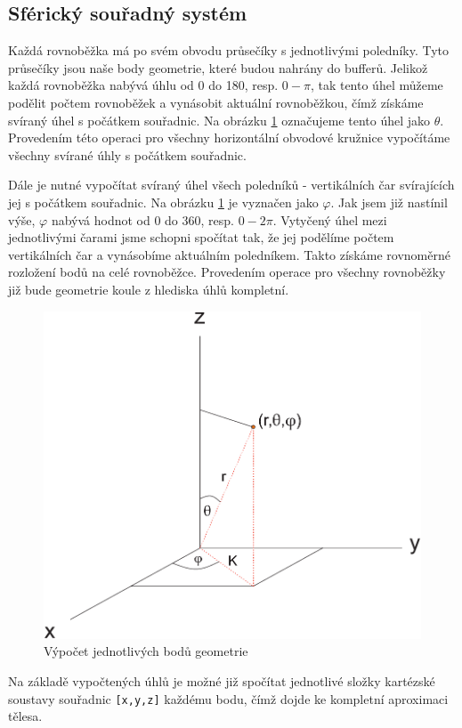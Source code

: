 \subsection{Sférický souřadný systém}

Každá rovnoběžka má po svém obvodu průsečíky s jednotlivými poledníky. Tyto průsečíky jsou naše body geometrie, které budou nahrány do bufferů. Jelikož každá rovnoběžka nabývá úhlu od 0 do 180\degree,  resp. $0-\pi$, tak tento úhel můžeme podělit počtem rovnoběžek a vynásobit aktuální rovnoběžkou, čímž získáme svíraný úhel s počátkem souřadnic. Na obrázku \ref{fig:geom} označujeme tento úhel jako $\theta$. Provedením této operaci pro všechny horizontální obvodové kružnice vypočítáme všechny svírané úhly s počátkem souřadnic. 

Dále je nutné vypočítat svíraný úhel všech poledníků - vertikálních čar svírajících jej s počátkem souřadnic. Na obrázku \ref{fig:geom} je vyznačen jako $\varphi$. Jak jsem již nastínil výše, $\varphi$ nabývá hodnot od 0 do 360\degree, resp. $0-2\pi$. Vytyčený úhel mezi jednotlivými čarami jsme schopni spočítat tak, že jej podělíme počtem vertikálních čar a vynásobíme aktuálním poledníkem. Takto získáme rovnoměrné rozložení bodů na celé rovnoběžce. Provedením  operace pro všechny rovnoběžky již bude geometrie koule z hlediska úhlů kompletní.

\begin{figure}[h]
	\label{img:2}
	\centering
	\includegraphics[scale=1.0,angle=0,width=0.6\linewidth]{obrazky-figures/geometry}
	\caption{Výpočet jednotlivých bodů geometrie}
	\label{fig:geom}
\end{figure}
 
Na základě vypočtených úhlů je možné již spočítat jednotlivé složky kartézské soustavy souřadnic \texttt{[x,y,z]} každému bodu, čímž dojde ke kompletní aproximaci tělesa.

